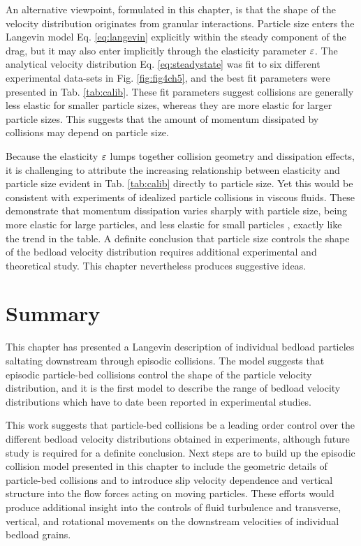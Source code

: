 An alternative viewpoint, formulated in this chapter, is that the shape of the velocity distribution originates from granular interactions.
Particle size enters the Langevin model Eq. \ref{eq:langevin} explicitly within the steady component of the drag, but it may also enter implicitly through the elasticity parameter $\varepsilon$.
The analytical velocity distribution Eq. \ref{eq:steadystate} was fit to six different experimental data-sets in Fig. \ref{fig:fig4ch5}, and the best fit parameters were presented in Tab. \ref{tab:calib}.
These fit parameters suggest collisions are generally less elastic for smaller particle sizes, whereas they are more elastic for larger particle sizes. This suggests that the amount of momentum dissipated by collisions may depend on particle size.

Because the elasticity $\varepsilon$ lumps together collision geometry and dissipation effects, it is challenging to attribute the increasing relationship between elasticity and particle size evident in Tab. \ref{tab:calib} directly to particle size.
Yet this would be consistent with experiments of idealized particle collisions in viscous fluids. These demonstrate that momentum dissipation varies sharply with particle size, being more elastic for large particles, and less elastic for small particles \citep{Joseph2001,Yang2006,Schmeeckle2001}, exactly like the trend in the table.
A definite conclusion that particle size controls the shape of the bedload velocity distribution requires additional experimental and theoretical study. This chapter nevertheless produces suggestive ideas.

\section{Summary}
\label{sec:langconclusion}
This chapter has presented a Langevin description of individual bedload particles saltating downstream through episodic collisions.
The model suggests that episodic particle-bed collisions control the shape of the particle velocity distribution, and it is the first model to describe the range of bedload velocity distributions which have to date been reported in experimental studies.

This work suggests that particle-bed collisions be a leading order control over the different bedload velocity distributions obtained in experiments, although future study is required for a definite conclusion.
Next steps are to build up the episodic collision model presented in this chapter to include the geometric details of particle-bed collisions and to introduce slip velocity dependence and vertical structure into the flow forces acting on moving particles.
These efforts would produce additional insight into the controls of fluid turbulence and transverse, vertical, and rotational movements on the downstream velocities of individual bedload grains.

